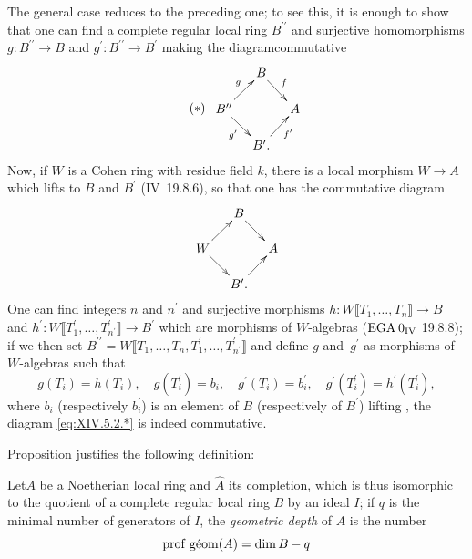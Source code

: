 The general case reduces to the preceding one; to see this, it is enough to show that one can find a complete regular local ring $B^{\prime\prime}$ and surjective homomorphisms $g\colon B^{\prime\prime}\to B$ and $g^{\prime}\colon B^{\prime\prime}\to B^{\prime}$ making the diagram\pageoriginale commutative
\begin{equation*} \label{eq:XIV.5.2.*} \tag{$*$}
\begin{array}{c}
\xymatrix@C=10pt@R=15pt{ & B\ar[rd]^-{f} & \\
B^{\prime\prime}\ar[ru]^-{g}\ar[rd]_-{g^{\prime}} & & A\\
& B^{\prime}.\ar[ru]_-{f^{\prime}} &
}
\end{array}
\end{equation*}
Now, if $W$ is a Cohen ring with residue field $k$, there is a local morphism $W\to A$ which lifts to $B$ and $B^{\prime}$ (\EGA IV~19.8.6), so that one has the commutative diagram
$$
\xymatrix@R=15pt@C=10pt{ & B\ar[rd] & \\
W\ar[ru]\ar[rd] & & A\\
& B^{\prime}.\ar[ru] & }$$
One can find integers $n$ and $n^{\prime}$ and surjective morphisms \hbox{$h\colon W\llbracket T_{1},\dots, T_{n}\rrbracket\!\to\! B$} and $h^{\prime}\colon W\llbracket T_{1}^{\prime},\dots, T_{n^{\prime}}^{\prime}\rrbracket\to B^{\prime}$ which are morphisms of $W$-algebras ($\textup{EGA}\kern.2em 0_{\textup{IV}}$ 19.8.8); if we then set $B^{\prime\prime}=W\llbracket T_{1},\dots, T_{n}, T_{1}^{\prime},\dots, T_{n^{\prime}}^{\prime}\rrbracket$ and define $g$ and~$g^{\prime}$ as morphisms of $W$-algebras such that
$$g(T_{i})=h(T_{i}), \quad g(T_{i}^{\prime})=b_{i}, \quad g^{\prime}(T_{i})=b_{i}^{\prime}, \quad g^{\prime}(T_{i}^{\prime})=h^{\prime}(T_{i}^{\prime}),
$$
where $b_{i}$ (respectively $b_{i}^{\prime}$) is an element of $B$ (respectively of $B^{\prime}$) lifting , the diagram \eqref{eq:XIV.5.2.*} is indeed commutative.

Proposition  justifies the following definition:

\begin{definition} \label{XIV.5.3}
Let\pageoriginale $A$ be a Noetherian local ring and $\widehat{A}$ its completion, which is thus isomorphic to the quotient of a complete regular local ring $B$ by an ideal $I$; if $q$ is the minimal number of generators of $I$, the \emph{geometric depth} of $A$ is the number
$$
\operatorname{prof\;g\acute{e}om}(A)=\dim B-q
$$
\end{definition}

